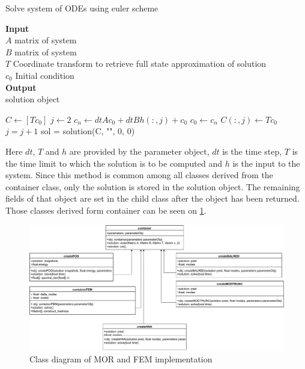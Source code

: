 \begin{algorithm}[H]
\caption{Solve system of ODEs using euler scheme}
\textbf{Input} \\
 \hspace*{\algorithmicindent} $A$ matrix of system \\
 \hspace*{\algorithmicindent} $B$ matrix of system \\
 \hspace*{\algorithmicindent} $T$ Coordinate transform to retrieve full state approximation of solution \\
 \hspace*{\algorithmicindent} $c_0$ Initial condition \\
 \textbf{Output} \\
 \hspace*{\algorithmicindent} solution object
\begin{algorithmic}[1]
\State $C \gets [Tc_0]$
\State $j \gets 2$
\State $c_n \gets dt A c_0 + dt B h(:, j) + c_0$
\State $c_0 \gets c_n$
\State $C(:, j) \gets T c_0$
\State $j = j+1$
\EndFor 
\State sol = solution(C, "", 0, 0)
\EndProcedure
\end{algorithmic}
\end{algorithm}
Here \(dt\), \(T\) and \(h\) are provided by the parameter object,
\(dt\) is the time step, \(T\) is the time limit to which the solution is to be computed and \(h\) is the input to the system.
Since this method is common among all classes derived from the container class, only the solution is stored in the solution object.
The remaining fields of that object are set in the child class after the object has been returned.
Those classes derived form container can be seen on \ref{fig-class-2}.
\begin{figure}[H]
\includegraphics[width=\textwidth]{images/container}
\caption{Class diagram of MOR and FEM implementation}
\label{fig-class-2}
\end{figure}

